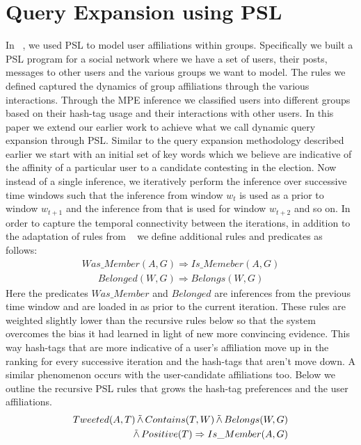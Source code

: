\section{Query Expansion using PSL}
In ~\cite{huang2012social}, we used PSL to model user affiliations within groups. 
Specifically we built a PSL program for a  social network where we have a set of users, their posts, messages to other users and the various groups we want to model. 
The rules we defined captured the dynamics of group affiliations through the various interactions.
Through the MPE inference we classified users into different groups based on their hash-tag usage and their interactions with other users.
\newline
In this paper we extend our earlier work to achieve what we call dynamic query expansion through PSL. 
Similar to the query expansion methodology described earlier we start with an initial set of key words which we believe are indicative of the affinity of a particular user to a candidate contesting in the election.
Now instead of a single inference, we iteratively perform the inference over successive time windows such that the inference from window $w_t$ is used as a prior to window $w_{t+1}$ and the inference from that is used for window $w_{t+2}$ and so on.
In order to capture the temporal connectivity between the iterations, in addition to the adaptation of rules from ~\cite{huang2012social} we define additional rules and predicates as follows:
\begin{align*}
Was\_Member(A,G) \Rightarrow Is\_Memeber(A,G)
\end{align*}
\begin{align*}
Belonged(W,G) \Rightarrow Belongs(W,G)
\end{align*}
Here the predicates $Was\_Member$ and $Belonged$ are inferences from the previous time window and are loaded in as  prior to the current iteration.
These rules are weighted slightly lower than the recursive rules below so that the system overcomes the bias it had learned in light of new more convincing evidence.
This way hash-tags that are more indicative of a user's affiliation move up in the ranking for every successive iteration and the hash-tags that aren't move down.
A similar phenomenon occurs with the user-candidate affiliations too.
Below we outline the recursive PSL rules that grows the hash-tag preferences and the user affiliations. 
\begin{align*}
\begin{split}
Tweeted(A,T) 
	\softand Contains(T,W)
	\softand Belongs(W,G) \\ 
	\softand Positive(T)
	\Rightarrow Is\_Member(A,G)
\end{split}
\end{align*}

